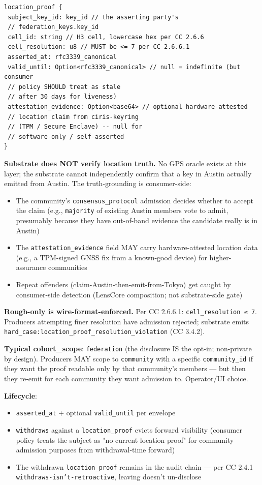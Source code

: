 \documentclass[11pt]{article}
\begin{document}
\begin{lstlisting}
location_proof {
 subject_key_id: key_id // the asserting party's
 // federation_keys.key_id
 cell_id: string // H3 cell, lowercase hex per CC 2.6.6
 cell_resolution: u8 // MUST be <= 7 per CC 2.6.6.1
 asserted_at: rfc3339_canonical
 valid_until: Option<rfc3339_canonical> // null = indefinite (but consumer
 // policy SHOULD treat as stale
 // after 30 days for liveness)
 attestation_evidence: Option<base64> // optional hardware-attested
 // location claim from ciris-keyring
 // (TPM / Secure Enclave) -- null for
 // software-only / self-asserted
}
\end{lstlisting}

\textbf{Substrate does NOT verify location truth.} No GPS oracle exists at this layer; the substrate cannot independently confirm that a key in Austin actually emitted from Austin. The truth-grounding is consumer-side:


\begin{itemize}\setlength\itemsep{0pt}
\item The community's \texttt{consensus\_protocol} admission decides whether to accept the claim (e.g., \texttt{majority} of existing Austin members vote to admit, presumably because they have out-of-band evidence the candidate really is in Austin)
\item The \texttt{attestation\_evidence} field MAY carry hardware-attested location data (e.g., a TPM-signed GNSS fix from a known-good device) for higher-assurance communities
\item Repeat offenders (claim-Austin-then-emit-from-Tokyo) get caught by consumer-side detection (LensCore composition; not substrate-side gate)
\end{itemize}


\textbf{Rough-only is wire-format-enforced.} Per CC 2.6.6.1: \texttt{cell\_resolution ≤ 7}. Producers attempting finer resolution have admission rejected; substrate emits \texttt{hard\_case:location\_proof\_resolution\_violation} (CC 3.4.2).


\textbf{Typical cohort\_scope}: \texttt{federation} (the disclosure IS the opt-in; non-private by design). Producers MAY scope to \texttt{community} with a specific \texttt{community\_id} if they want the proof readable only by that community's members — but then they re-emit for each community they want admission to. Operator/UI choice.


\textbf{Lifecycle}:


\begin{itemize}\setlength\itemsep{0pt}
\item \texttt{asserted\_at} + optional \texttt{valid\_until} per envelope
\item \texttt{withdraws} against a \texttt{location\_proof} evicts forward visibility (consumer policy treats the subject as "no current location proof" for community admission purposes from withdrawal-time forward)
\item The withdrawn \texttt{location\_proof} remains in the audit chain — per CC 2.4.1 \texttt{withdraws-isn't-retroactive}, leaving doesn't un-disclose
\end{itemize}
\end{document}
